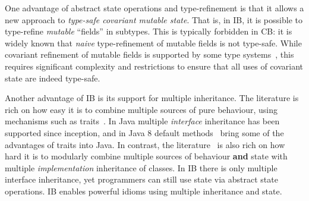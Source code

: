 One advantage of abstract state operations and
type-refinement is that it allows a new approach to
\emph{type-safe covariant mutable state}. That is, in IB,
it is possible to type-refine \emph{mutable} ``fields'' in subtypes. This is
typically forbidden in CB: it is widely known that \emph{naive} type-refinement of
mutable fields is not type-safe. While covariant refinement of mutable
fields is supported by some type systems~\cite{bruce98astatically,bruce1994paradigmatic,ernst06virtual,Saito2013933}, this requires
significant complexity and restrictions to ensure that all uses of
covariant state are indeed type-safe.

\begin{comment}
\marcoT{%

In this paper we show how to support type-safe
\textbf{field removal},
\textbf{field type refinement} allowing a kind of covariant setters refinement,
and \textbf{multiple inheritance}.}
\end{comment}

Another advantage of IB is its support for
multiple inheritance. The literature is rich on how
easy it is to combine multiple sources of pure behaviour,
using mechanisms such as traits~\cite{scharli03traits}. In Java
multiple \emph{interface} inheritance has been supported since
inception, and in Java 8 default methods~\cite{goetz12fdefenders} bring some of the
advantages of traits into Java. In contrast, the literature~\cite{Sak89dis,bracha90mixin,malayeri2009cz}
is also rich on how hard it is to modularly combine multiple sources
of behaviour \textbf{and} state with multiple \emph{implementation}
inheritance of classes. In IB there is only multiple
interface inheritance, yet programmers can still use state via 
abstract state operations. IB enables powerful
idioms using multiple inheritance and state.



